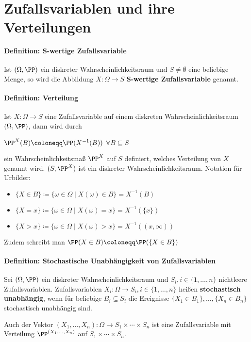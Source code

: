 \section{Zufallsvariablen und ihre Verteilungen}
\paragraph{Definition: $\boldsymbol{S}$-wertige Zufallsvariable}
Ist $(\Omega,\PP)$ ein diskreter Wahrscheinlichkeitsraum und $S\neq\emptyset$ eine beliebige Menge, so wird die Abbildung $X:\Omega\rightarrow S$ $\boldsymbol{S}$\textbf{-wertige Zufallsvariable} genannt.

\paragraph{Definition: Verteilung}
Ist $X:\Omega\rightarrow S$ eine Zufallsvariable auf einem diskreten Wahrscheinlichkeitsraum $(\Omega,\PP)$, dann wird durch 
\begin{tightcenter}
	$\PP^X(B)\coloneqq\PP(X^{-1}(B))$ \qquad$\forall B\subseteq S$
\end{tightcenter}
ein Wahrscheinlichkeitsmaß $\PP^X$ auf $S$ definiert, welches Verteilung von $X$ genannt wird.
$(S,\PP^X)$ ist ein diskreter Wahrscheinlichkeitsraum.
Notation für Urbilder:
\begin{itemize}
	\item $\{X\in B\}\coloneqq \{\omega\in\Omega\mid X(\omega)\in B\}=X^{-1}(B)$
	\item $\{X=x\}\coloneqq \{\omega\in\Omega\mid X(\omega)=x\}=X^{-1}(\{x\})$
	\item $\{X>x\}\coloneqq \{\omega\in\Omega\mid X(\omega)>x\}=X^{-1}((x,\infty))$
\end{itemize}
Zudem schreibt man $\PP(X\in B)\coloneqq \PP(\{X\in B\})$

\paragraph{Definition: Stochastische Unabhängigkeit von Zufallsvariablen}
Sei $(\Omega,\PP)$ ein diskreter Wahrscheinlichkeitsraum und $S_i,i\in\{1,\ldots,n\}$ nichtleere Zufallsvariablen.
Zufallsvariablen $X_i:\Omega\rightarrow S_i, i\in\{1,\ldots,n\}$ heißen \textbf{stochastisch unabhängig}, wenn für beliebige $B_i\subseteq S_i$ die Ereignisse $\{X_1\in B_1\},\ldots,\{X_n\in B_n\}$ stochastisch unabhängig sind.

Auch der Vektor $(X_1,\ldots,X_n):\Omega\rightarrow S_1\times\cdots\times S_n$ ist eine Zufallsvariable mit Verteilung $\PP^{(X_1,\ldots,X_n)}$ auf $S_1\times\cdots\times S_n$.

